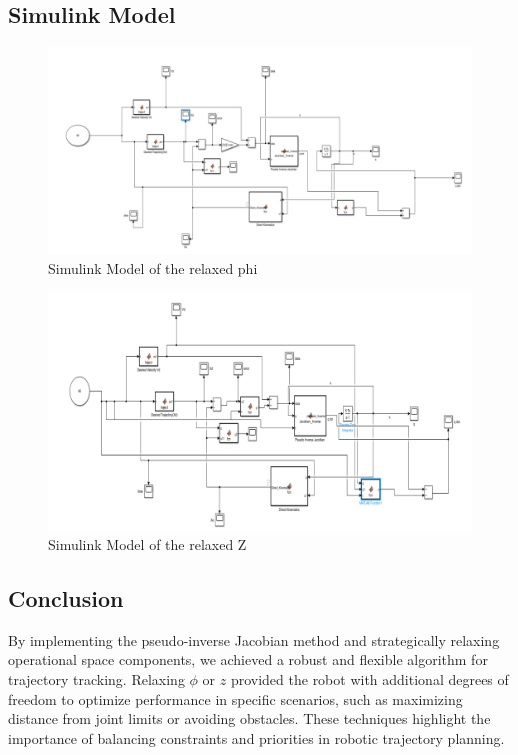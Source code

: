 \documentclass[12pt]{report}
\begin{document}
\subsection{Simulink Model}
\begin{figure}[H]
	\hspace{-15mm}
	\includegraphics[scale=0.9]{S5} %
	\caption{Simulink Model of the relaxed phi}
	\label{run10} %
\end{figure}
\begin{figure}[H]
	\hspace{-15mm}
	\includegraphics[scale=0.8]{S6} %
	\caption{Simulink Model of the relaxed Z}
	\label{run10} %
\end{figure}
\subsection{Conclusion}

By implementing the pseudo-inverse Jacobian method and strategically relaxing operational space components, we achieved a robust and flexible algorithm for trajectory tracking. Relaxing \(\phi\) or \(z\) provided the robot with additional degrees of freedom to optimize performance in specific scenarios, such as maximizing distance from joint limits or avoiding obstacles. These techniques highlight the importance of balancing constraints and priorities in robotic trajectory planning.
	
\end{document}
